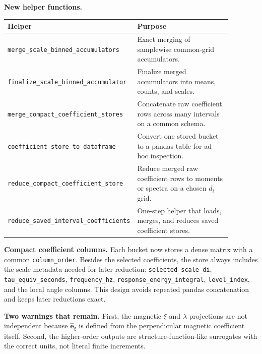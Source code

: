 \documentclass[10pt]{article}
\begin{document}
\textbf{New helper functions.}
\begin{center}
\begin{tabular}{p{0.34\linewidth} p{0.54\linewidth}}
\toprule
Helper & Purpose \\
\midrule
\texttt{merge\_scale\_binned\_accumulators} & Exact merging of samplewise common-grid accumulators. \\
\texttt{finalize\_scale\_binned\_accumulator} & Finalize merged accumulators into means, counts, and scales. \\
\texttt{merge\_compact\_coefficient\_stores} & Concatenate raw coefficient rows across many intervals on a common schema. \\
\texttt{coefficient\_store\_to\_dataframe} & Convert one stored bucket to a pandas table for ad hoc inspection. \\
\texttt{reduce\_compact\_coefficient\_store} & Reduce merged raw coefficient rows to moments or spectra on a chosen $d_i$ grid. \\
\texttt{reduce\_saved\_interval\_coefficients} & One-step helper that loads, merges, and reduces saved coefficient stores. \\
\bottomrule
\end{tabular}
\end{center}

\textbf{Compact coefficient columns.} Each bucket now stores a dense matrix with a common \texttt{column\_order}. Besides the selected coefficients, the store always includes the scale metadata needed for later reduction: \texttt{selected\_scale\_di}, \texttt{tau\_equiv\_seconds}, \texttt{frequency\_hz}, \texttt{response\_energy\_integral}, \texttt{level\_index}, and the local angle columns. This design avoids repeated pandas concatenation and keeps later reductions exact.

\textbf{Two warnings that remain.} First, the magnetic $\xi$ and $\lambda$ projections are not independent because $\hat{\mathbf e}_{\xi}$ is defined from the perpendicular magnetic coefficient itself. Second, the higher-order outputs are structure-function-like surrogates with the correct units, not literal finite increments.
\end{document}
